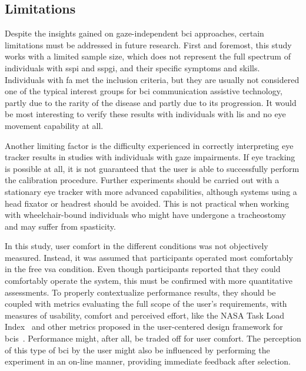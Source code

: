 \documentclass[twocolumn]{article}
\begin{document}
\subsection{Limitations}

Despite the insights gained on gaze-independent \ac{bci} approaches, certain limitations must be addressed in future research.
First and foremost, this study works with a limited sample size, which
does not represent the full spectrum of individuals with \ac{sspi} and
\ac{sspgi}, and their specific symptoms and skills.
Individuals with \ac{fa} met the inclusion criteria, but they are usually not
considered one of the typical interest groups for \ac{bci} communication assistive
technology, partly due to the rarity of the disease and partly due to its
progression.
It would be most interesting to verify these results with individuals with
\ac{lis} and no eye movement capability at all.

Another limiting factor is the difficulty experienced in correctly interpreting eye
tracker results in studies with individuals with gaze impairments.
If eye tracking is possible at all, it is not guaranteed that the user is able
to successfully perform the calibration procedure.
Further experiments should be carried out with a stationary eye tracker with
more advanced capabilities, although systems using a head fixator or headrest
should be avoided.
This is not practical when working with
wheelchair-bound individuals who might have undergone a tracheostomy and may
suffer from spasticity.

In this study, user comfort in the different conditions was not objectively
measured.
Instead, it was assumed that participants operated most comfortably in the free
\ac{vsa} condition.
Even though participants reported that they could comfortably operate the
system, this must be confirmed with more quantitative assessments.
To properly contextualize performance results, they should be coupled with
metrics evaluating the full scope of the user's requirements, with measures of
usability, comfort and perceived effort, like the NASA Task Load
Index~\cite{Hart2006} and other metrics proposed in the user-centered design
framework for \acp{bci}~\cite{Kuebler2014}.
Performance might, after all, be traded off for user comfort.
The perception of this type of \ac{bci} by the user might also be influenced by
performing the experiment in an on-line manner, providing immediate feedback
after selection.
\end{document}

